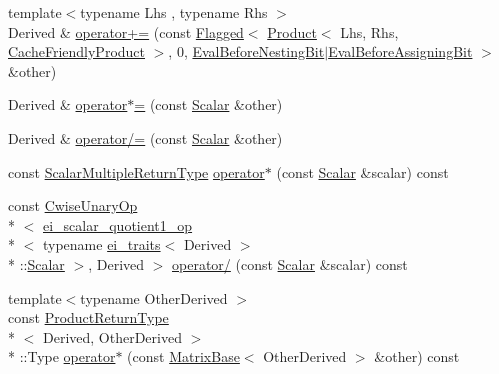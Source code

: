 \begin{DoxyCompactItemize}
\item 
{\footnotesize template$<$typename Lhs , typename Rhs $>$ }\\Derived \& \hyperlink{class_matrix_base_a770d26b5bdc015ed3284ca24d320a492}{operator+=} (const \hyperlink{class_flagged}{Flagged}$<$ \hyperlink{class_product}{Product}$<$ Lhs, Rhs, \hyperlink{_constants_8h_a19539c4a85742928cd91d83569d63c06a3adaf09db92895066d5e22f9eed4e68e}{Cache\-Friendly\-Product} $>$, 0, \hyperlink{group__flags_gaf8ad6e2956f7368b8e3f7407e2319e63}{Eval\-Before\-Nesting\-Bit}$|$\hyperlink{group__flags_gadc8925e67a5a54bd479d6f587112e19a}{Eval\-Before\-Assigning\-Bit} $>$ \&other)
\item 
Derived \& \hyperlink{class_matrix_base_a29cb50ed2ced7c4922cfdb2a2dff1e4c}{operator$\ast$=} (const \hyperlink{class_matrix_base_a625df8339dc2d816cbc0fd66e7dadaf5}{Scalar} \&other)
\item 
Derived \& \hyperlink{class_matrix_base_abf66d0d280b34834d20e72165450f39f}{operator/=} (const \hyperlink{class_matrix_base_a625df8339dc2d816cbc0fd66e7dadaf5}{Scalar} \&other)
\item 
const \hyperlink{class_matrix_base_a9230932303a92e0e58314d0daee8a9e6}{Scalar\-Multiple\-Return\-Type} \hyperlink{class_matrix_base_a7abb7b3de0d085e1f9fa391e4b7eb489}{operator$\ast$} (const \hyperlink{class_matrix_base_a625df8339dc2d816cbc0fd66e7dadaf5}{Scalar} \&scalar) const 
\item 
const \hyperlink{class_cwise_unary_op}{Cwise\-Unary\-Op}\\*
$<$ \hyperlink{structei__scalar__quotient1__op}{ei\-\_\-scalar\-\_\-quotient1\-\_\-op}\\*
$<$ typename \hyperlink{structei__traits}{ei\-\_\-traits}$<$ Derived $>$\\*
\-::\hyperlink{class_matrix_base_a625df8339dc2d816cbc0fd66e7dadaf5}{Scalar} $>$, Derived $>$ \hyperlink{class_matrix_base_a530e410d4110d86f8c645eda17cd7d62}{operator/} (const \hyperlink{class_matrix_base_a625df8339dc2d816cbc0fd66e7dadaf5}{Scalar} \&scalar) const 
\item 
{\footnotesize template$<$typename Other\-Derived $>$ }\\const \hyperlink{struct_product_return_type}{Product\-Return\-Type}\\*
$<$ Derived, Other\-Derived $>$\\*
\-::Type \hyperlink{class_matrix_base_a0d7ff25af6b3567ca72ebe2ff58709cf}{operator$\ast$} (const \hyperlink{class_matrix_base}{Matrix\-Base}$<$ Other\-Derived $>$ \&other) const 
\item 

\end{DoxyCompactItemize}
